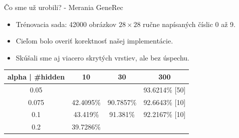 \documentclass[xcolor=dvipsnames]{beamer}
\begin{document}
\begin{frame}{Čo sme už urobili? - Merania GeneRec}
  \begin{itemize}
    \item Trénovacia sada: 42000 obrázkov $28 \times 28$ ručne napísaných číslic 0 až 9.  
    \item Cieľom bolo overiť korektnosť našej implementácie. 
    \item Skúšali sme aj viacero skrytých vrstiev, ale bez úspechu. 
  \end{itemize} 

  \begin{tabular}{|c|c|c|c|}
    \hline
    alpha | \#hidden & 10 & 30 & 300 \\
    \hline
    0.05 & & & 93.6214\% [50] \\
    \hline
    0.075 & 42.4095\% & 90.7857\% & 92.6643\% [10] \\
    \hline
    0.1 & 43.419\% & 91.381\% & 92.2167\% [10] \\
    \hline
    0.2 & 39.7286\% & & \\
    \hline
  \end{tabular}
  
\end{frame}




\end{document}
